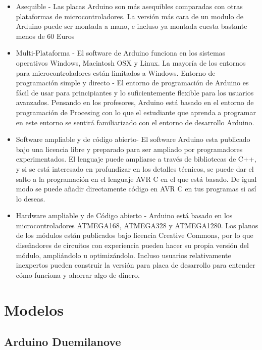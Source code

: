 \documentclass[12pt,a4paper]{report}
\begin{document}
\begin{itemize} 
    \item Asequible - Las placas Arduino son más asequibles comparadas con
    otras plataformas de microcontroladores. La versión más cara de un modulo
    de Arduino puede ser montada a mano, e incluso ya montada cuesta bastante
    menos de 60 Euros
    
    \item Multi-Plataforma - El software de Arduino funciona en los sistemas
    operativos Windows, Macintosh OSX y Linux. La mayoría de los entornos para
    microcontroladores están limitados a Windows.
    Entorno de programación simple y directo - El entorno de programación de Arduino
    es fácil de usar para principiantes y lo suficientemente flexible para los
    usuarios avanzados. Pensando en los profesores, Arduino está basado en el
    entorno de programación de Procesing con lo que el estudiante que aprenda a
    programar en este entorno se sentirá familiarizado con el entorno de desarrollo
    Arduino.

    \item Software ampliable y de código abierto- El software Arduino esta
    publicado bajo una licencia libre y preparado para ser ampliado por
    programadores experimentados. El lenguaje puede ampliarse a través de
    bibliotecas de C++, y si se está interesado en profundizar en los detalles
    técnicos, se puede dar el salto a la programación en el lenguaje AVR C en el
    que está basado. De igual modo se puede añadir directamente código en AVR C
    en tus programas si así lo deseas.
	
    \item Hardware ampliable y de Código abierto - Arduino está basado en los
    microcontroladores ATMEGA168, ATMEGA328 y ATMEGA1280. Los planos de los
    módulos están publicados bajo licencia Creative Commons, por lo que
    diseñadores de circuitos con experiencia pueden hacer su propia versión del
    módulo, ampliándolo u optimizándolo. Incluso usuarios relativamente
    inexpertos pueden construir la versión para placa de desarrollo para
    entender cómo funciona y ahorrar algo de dinero.
\end{itemize}

\section{Modelos}
\subsection{Arduino Duemilanove}
\end{document}
